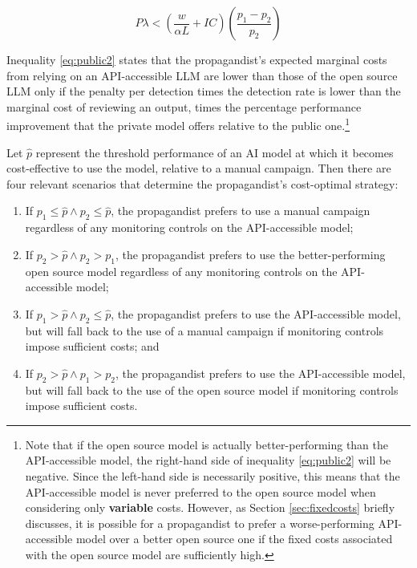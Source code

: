 \documentclass{article}
\begin{document}
\begin{equation}
  \label{eq:public2}
  P\lambda < \left(\frac{w}{\alpha L} + IC\right)\left(\frac{p_1 - p_2}{p_2}\right)
\end{equation}

Inequality \ref{eq:public2} states that the propagandist's expected marginal costs from relying on an API-accessible LLM are lower than those of the open source LLM only if the penalty per detection times the detection rate is lower than the marginal cost of reviewing an output, times the percentage performance improvement that the private model offers relative to the public one.\footnote{Note that if the open source model is actually better-performing than the API-accessible model, the right-hand side of inequality \ref{eq:public2} will be negative. Since the left-hand side is necessarily positive, this means that the API-accessible model is never preferred to the open source model when considering only \textbf{variable} costs. However, as Section \ref{sec:fixedcosts} briefly discusses, it is possible for a propagandist to prefer a worse-performing API-accessible model over a better open source one if the fixed costs associated with the open source model are sufficiently high.} 

Let $\hat{p}$ represent the threshold performance of an AI model at which it becomes cost-effective to use the model, relative to a manual campaign. Then there are four relevant scenarios that determine the propagandist's cost-optimal strategy: 

\begin{enumerate}
  \item If $p_1 \leq \hat{p} \land p_2 \leq \hat{p}$, the propagandist prefers to use a manual campaign regardless of any monitoring controls on the API-accessible model;
  \item If $p_2 > \hat{p} \land p_2 > p_1$, the propagandist prefers to use the better-performing open source model regardless of any monitoring controls on the API-accessible model; 
  \item If $p_1 > \hat{p} \land p_2 \leq \hat{p}$, the propagandist prefers to use the API-accessible model, but will fall back to the use of a manual campaign if monitoring controls impose sufficient costs; and
  \item If $p_2 > \hat{p} \land p_1 > p_2$, the propagandist prefers to use the API-accessible model, but will fall back to the use of the open source model if monitoring controls impose sufficient costs.
\end{enumerate}
\end{document}
